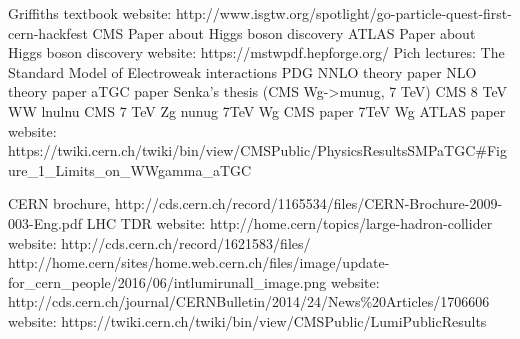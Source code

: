 \begin{thebibliography}{1}
 Griffiths textbook
 website: http://www.isgtw.org/spotlight/go-particle-quest-first-cern-hackfest
 CMS Paper about Higgs boson discovery
 ATLAS Paper about Higgs boson discovery
 website: https://mstwpdf.hepforge.org/
 Pich lectures: The Standard Model of Electroweak interactions
 PDG
 NNLO theory paper
 NLO theory paper
 aTGC paper
 Senka's thesis (CMS Wg->munug, 7 TeV)
 CMS 8 TeV WW lnulnu
 CMS 7 TeV Zg nunug
 7TeV Wg CMS paper
 7TeV Wg ATLAS paper
 website: https://twiki.cern.ch/twiki/bin/view/CMSPublic/PhysicsResultsSMPaTGC\#Figure\_1\_Limits\_on\_WWgamma\_aTGC

 CERN brochure, http://cds.cern.ch/record/1165534/files/CERN-Brochure-2009-003-Eng.pdf
 LHC TDR
 website: http://home.cern/topics/large-hadron-collider
 website: http://cds.cern.ch/record/1621583/files/
 http://home.cern/sites/home.web.cern.ch/files/image/update-for\_cern\_people/2016/06/intlumirunall\_image.png 
 website: http://cds.cern.ch/journal/CERNBulletin/2014/24/News\%20Articles/1706606
 website: https://twiki.cern.ch/twiki/bin/view/CMSPublic/LumiPublicResults


\end{thebibliography}
